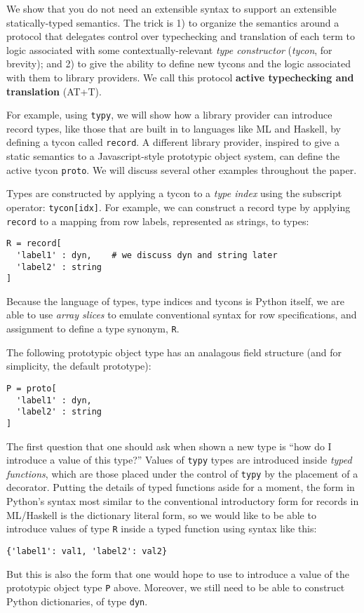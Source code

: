 \documentclass[preprint,10pt]{sigplanconf}
\newcommand{\lip}[1]{\lstinline[language=Python,basicstyle=\ttfamily\small,deletendkeywords={tuple,buffer,map}]{#1}}
\begin{document}
We show that you do not need an extensible syntax to support an extensible statically-typed  semantics. The trick is 1) to organize the semantics around a protocol that delegates control over typechecking and translation of each term to logic associated with some contextually-relevant \emph{type constructor} (\emph{tycon}, for brevity); and 2) to give the ability to define new tycons and the logic associated with them to library providers. We call this protocol \textbf{active typechecking and translation} (AT+T).

For example, using \lip{typy}, we will show how a library provider can introduce record types, like those that are built in to languages like ML and Haskell, by defining a tycon called \lip{record}. A different library provider, inspired to give a static semantics to a Javascript-style prototypic object system, can define the active tycon \lip{proto}. We will discuss several other examples throughout the paper.

Types are constructed by applying a tycon to a \emph{type index} using the subscript operator: \lip{tycon[idx]}. For example, we can construct a record type by applying \lip{record} to a mapping from row labels, represented as strings, to types:
\begin{lstlisting}[numbers=none]
R = record[
  'label1' : dyn,    # we discuss dyn and string later
  'label2' : string
]
\end{lstlisting}
Because the language of types, type indices and tycons is Python itself, we are able to use \emph{array slices} to emulate conventional syntax for row specifications, and assignment to define a type synonym, \lip{R}.%

The following prototypic object type has an analagous field structure (and for simplicity, the default prototype):
\begin{lstlisting}[numbers=none]
P = proto[
  'label1' : dyn,   
  'label2' : string 
]
\end{lstlisting}

The first question that one should ask when shown a new type is ``how do I introduce a value of this type?'' Values of \lip{typy} types are introduced inside \emph{typed functions}, which are those placed under the control of \lip{typy} by the placement of a decorator. Putting the details of typed functions aside for a moment, the form in Python's syntax most similar to the conventional introductory form for records in ML/Haskell is the dictionary literal form, so we would like to be able to introduce values of type \lip{R} inside a typed function using syntax like this:
\begin{lstlisting}[numbers=none]
{'label1': val1, 'label2': val2} 
\end{lstlisting}
But this is also the form that one would hope to use to introduce a value of the prototypic object type \lip{P} above. Moreover, we still need to be able to construct Python dictionaries, of type \lip{dyn}. 
\end{document}

